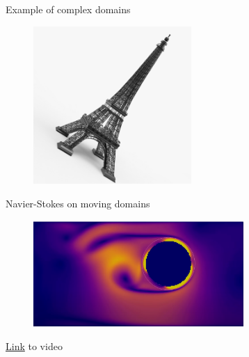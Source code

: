 \begin{frame}{Example of complex domains}

        \begin{figure}
            \centering
            \includegraphics[width=6cm]{figures/eiffel_tower.jpg}
        \end{figure}

\end{frame}
\begin{frame}{Navier-Stokes on moving domains}

        \begin{figure}
            \centering
            \includegraphics[width=8cm]{figures/navier_stokes.png}
        \end{figure}

    \href{https://www.youtube.com/watch?v=9dYdPOgPDUI&ab_channel=SigmundEggenHolm}{Link} to video
\end{frame}
